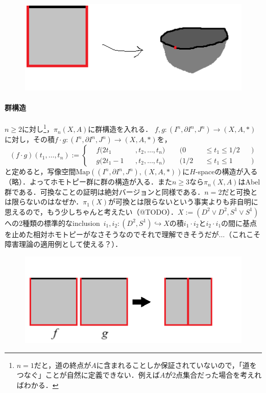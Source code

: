 \documentclass[a4paper,11pt]{jsarticle}
\begin{document}
\begin{figure}[h]
  \centering
  \includegraphics[]{I^2.png}
\end{figure}
\paragraph{群構造}
$n\ge 2$に対し\footnote{$n=1$だと，道の終点が$A$に含まれることしか保証されていないので，「道をつなぐ」ことが自然に定義できない．例えば$A$が2点集合だった場合を考えればわかる．}，$\pi_n(X,A)$に群構造を入れる．
$f,g\colon (I^n,\partial I^n,J^n)\to (X,A,*)$に対し，その積$f\cdot g\colon (I^n,\partial I^n,J^n)\to (X,A,*)$を，\[
  (f\cdot g)(t_1,\dots,t_n):=\left\{
  \begin{alignedat}{5}
    &f(2t_1&&,t_2,\dots,t_n)\ \ &&(0&&\le t_1\le 1/2&&)\\
    &g(2t_1-1&&,t_2,\dots,t_n)\ \ &&(1/2&&\le t_1\le 1&&)
  \end{alignedat}\right.
\]と定めると，写像空間$\mathrm{Map}((I^n,\partial I^n,J^n),(X,A,*))$に$H$-spaceの構造が入る（略）．よってホモトピー群に群の構造が入る．また$n\ge 3$なら$\pi_n(X,A)$はAbel群である．可換なことの証明は絶対バージョンと同様である．$n=2$だと可換とは限らないのはなぜか．$\pi_1(X)$が可換とは限らないという事実よりも非自明に思えるので，もう少しちゃんと考えたい（@TODO）．$X:=(D^2\vee D^2,S^1\vee S^1)$への2種類の標準的なinclusion\ $i_1,i_2\colon(D^2,S^1)\hookrightarrow X$の積$i_1\cdot i_2$と$i_2\cdot i_1$の間に基点を止めた相対ホモトピーがなさそうなのでそれで理解できそうだが$\dots$（これこそ障害理論の適用例として使える？）．
\begin{figure}[h]
  \centering
  \includegraphics{defOfHomotopyGroup_composition.png}
\end{figure}
\end{document}
